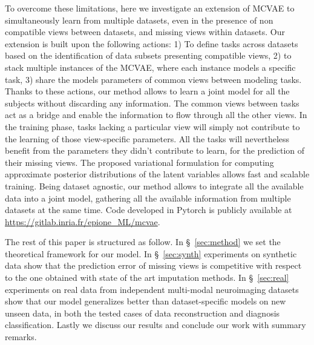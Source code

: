 To overcome these limitations, here we investigate an extension of MCVAE to simultaneously learn from multiple datasets, even in the presence of non compatible views between datasets, and missing views within datasets.
Our extension  is built upon the following actions:
1) To define tasks across datasets based on the identification of data subsets presenting compatible views,
2) to stack multiple instances of the MCVAE, where each instance models a specific task,
3) share the models parameters of common views between modeling tasks.
%
Thanks to these actions, our method allows to learn a joint model for all the subjects without discarding any information.
The common views between tasks act as a bridge and enable the information to flow through all the other views.
In the training phase, tasks lacking a particular view will simply not contribute to the learning of those view-specific parameters.
All the tasks will nevertheless benefit from the parameters they didn't contribute to learn, for the prediction of their missing views.
The proposed variational formulation for computing approximate posterior distributions of the latent variables allows fast and scalable training.
Being dataset agnostic, our method allows to integrate all the available data into a joint model, gathering  all the available information from multiple datasets at the same time.
Code developed in Pytorch \citep{Paszke2019} is publicly available at \url{https://gitlab.inria.fr/epione\_ML/mcvae}.

The rest of this paper is structured as follow.
In \S~\ref{sec:method} we set the theoretical framework for our model.
In \S~\ref{sec:synth} experiments on synthetic data show that the prediction error of missing views is competitive with respect to the one obtained with state of the art imputation methods.
In \S~\ref{sec:real} experiments on real data from independent multi-modal neuroimaging datasets show that our model generalizes better than dataset-specific models on new unseen data, in both the tested cases of data reconstruction and diagnosis classification.
Lastly we discuss our results and conclude our work with summary remarks.
